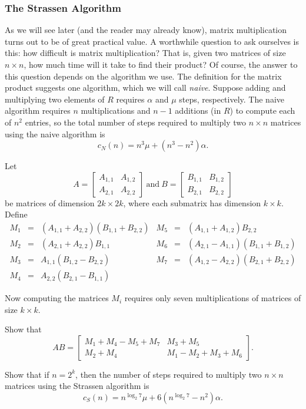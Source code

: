 \subsubsection*{The Strassen Algorithm}

As we will see later (and the reader may already know), matrix multiplication turns out to be of great practical value. A worthwhile question to ask ourselves is this: how difficult is matrix multiplication? That is, given two matrices of size $n \times n$, how much time will it take to find their product? Of course, the answer to this question depends on the algorithm we use. The definition for the matrix product suggests one algorithm, which we will call \emph{naive}. Suppose adding and multiplying two elements of $R$ requires $\alpha$ and $\mu$ steps, respectively. The naive algorithm requires $n$ multiplications and $n-1$ additions (in $R$) to compute each of $n^2$ entries, so the total number of steps required to multiply two $n \times n$ matrices using the naive algorithm is $$c_N(n) = n^3 \mu + (n^3 - n^2)\alpha.$$

Let \[A = \left[\begin{array}{c|c} A_{1,1} & A_{1,2} \\ \hline A_{2,1} & A_{2,2} \end{array}\right]\ \mathrm{and}\ B = \left[\begin{array}{c|c} B_{1,1} & B_{1,2} \\ \hline B_{2,1} & B_{2,2} \end{array}\right]\] be matrices of dimension $2k \times 2k$, where each submatrix has dimension $k \times k$. Define 
\[ \begin{array}{rclrcl} 
M_1 & = & (A_{1,1} + A_{2,2})(B_{1,1} + B_{2,2}) & M_5 & = & (A_{1,1} + A_{1,2})B_{2,2} \\ 
M_2 & = & (A_{2,1} + A_{2,2})B_{1,1} & M_6 & = & (A_{2,1} - A_{1,1})(B_{1,1} + B_{1,2}) \\
M_3 & = & A_{1,1}(B_{1,2} - B_{2,2}) & M_7 & = & (A_{1,2} - A_{2,2})(B_{2,1} + B_{2,2}) \\
M_4 & = & A_{2,2}(B_{2,1} - B_{1,1}) & & & \end{array}\]

Now computing the matrices $M_i$ requires only seven multiplications of matrices of size $k \times k$.

\begin{exercises}
\ResumeExercises

\item 
Show that 
\[ AB = \left[\begin{array}{c|c} M_1 + M_4 - M_5 + M_7 & M_3 + M_5 \\ \hline M_2 + M_4 & M_1 - M_2 + M_3 + M_6 \end{array}\right]. \]

\item 
Show that if $n = 2^k$, then the number of steps required to multiply two $n \times n$ matrices using the Strassen algorithm is $$c_S(n) = n^{\log_2 7} \mu + 6(n^{\log_2 7} - n^2)\alpha.$$
\end{exercises}

